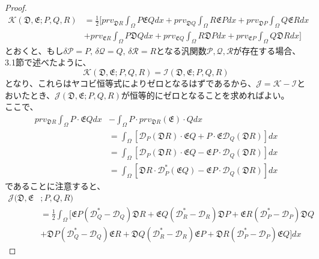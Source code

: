 \documentclass[a4paper, 11pt]{report}
\theoremstyle{definition}
\begin{document}
\begin{proof}
\begin{align}
\mathcal{K}(\mathfrak{D},\mathfrak{E};P,Q,R) &= \frac{1}{2}[ prv_{\mathfrak{D}R}\int_\Omega P\mathfrak{E}Qdx + prv_{\mathfrak{D}Q}\int_\Omega R\mathfrak{E}Pdx + prv_{\mathfrak{D}P}\int_\Omega Q\mathfrak{E}Rdx\nonumber\\
&+ prv_{\mathfrak{E}R}\int_\Omega P\mathfrak{D}Qdx + prv_{\mathfrak{E}Q}\int_\Omega R\mathfrak{D}Pdx + prv_{\mathfrak{E}P}\int_\Omega Q\mathfrak{D}Rdx ]  %
\end{align}
とおくと、もし$\delta\mathcal{P}=P, \, \delta\mathcal{Q}=Q, \, \delta\mathcal{R}=R$となる汎関数$\mathcal{P},\mathcal{Q},\mathcal{R}$が存在する場合、3.1節で述べたように、
\begin{equation}
\mathcal{K}(\mathfrak{D},\mathfrak{E};P,Q,R) = \mathcal{I}(\mathfrak{D},\mathfrak{E};P,Q,R)
\end{equation}
となり、これらはヤコビ恒等式によりゼロとなるはずであるから、$\mathcal{J}=\mathcal{K}-\mathcal{I}$とおいたとき、$\mathcal{J}(\mathfrak{D},\mathfrak{E};P,Q,R)$が恒等的にゼロとなることを求めればよい。\\
 ここで、
\begin{align*}
prv_{\mathfrak{D}R}\int_\Omega P\cdot\mathfrak{E}Qdx &- \int_\Omega P\cdot prv_{\mathfrak{D}R}(\mathfrak{E})\cdot Qdx\\
&= \int_\Omega [\mathcal{D}_P(\mathfrak{D}R)\cdot\mathfrak{E}Q + P\cdot \mathfrak{E}\mathcal{D}_Q(\mathfrak{D}R)]dx\\
&= \int_\Omega [\mathcal{D}_P(\mathfrak{D}R)\cdot\mathfrak{E}Q -  \mathfrak{E}P\cdot\mathcal{D}_Q(\mathfrak{D}R)]dx\\
&= \int_\Omega [\mathfrak{D}R\cdot\mathcal{D}_{P}^*(\mathfrak{E}Q) - \mathfrak{E}P\cdot\mathcal{D}_Q(\mathfrak{D}R)]dx
\end{align*}
であることに注意すると、
\begin{align}
\mathcal{J}(\mathfrak{D},\mathfrak{E}&;P,Q,R)\nonumber\\
&= \frac{1}{2}\int_\Omega [\mathfrak{E}P(\mathcal{D}_{Q}^*-\mathcal{D}_Q)\mathfrak{D}R + \mathfrak{E}Q(\mathcal{D}_{R}^*-\mathcal{D}_R)\mathfrak{D}P + \mathfrak{E}R(\mathcal{D}_{P}^*-\mathcal{D}_P)\mathfrak{D}Q\nonumber\\
&+ \mathfrak{D}P(\mathcal{D}_{Q}^*-\mathcal{D}_Q)\mathfrak{E}R + \mathfrak{D}Q(\mathcal{D}_{R}^*-\mathcal{D}_R)\mathfrak{E}P + \mathfrak{D}R(\mathcal{D}_{P}^*-\mathcal{D}_P)\mathfrak{E}Q ]dx  %
\end{align}

\end{proof}
\end{document}
